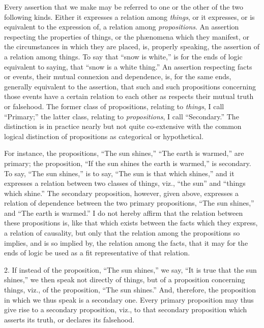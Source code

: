 \documentclass[oneside]{book}
\begin{document}
Every assertion that we make may be referred to one or the
other of the two following kinds. Either it expresses a relation
among \textit{things}, or it expresses, or is equivalent to the expression of,
a relation among \textit{propositions}. An assertion respecting the properties
of things, or the ph\ae{}nomena which they manifest, or the
circumstances in which they are placed, is, properly speaking, the
assertion of a relation among things. To say that ``snow is
white,'' is for the ends of logic equivalent to saying, that ``snow
is a white thing.'' An assertion respecting facts or events, their
mutual connexion and dependence, is, for the same ends, generally
equivalent to the assertion, that such and such propositions concerning
those events have a certain relation to each other as
respects their mutual truth or falsehood. The former class of
propositions, relating to \textit{things}, I call ``Primary;'' the latter class,
relating to \textit{propositions}, I call ``Secondary.'' The distinction is
in practice nearly but not quite co-extensive with the common
logical distinction of propositions as categorical or hypothetical.

For instance, the propositions, ``The sun shines,'' ``The earth
is warmed,'' are primary; the proposition, ``If the sun shines
the earth is warmed,'' is secondary. To say, ``The sun shines,''
is to say, ``The sun is that which shines,'' and it expresses a relation between two classes of things, viz., ``the sun'' and ``things
which shine.'' The secondary proposition, however, given above,
expresses a relation of dependence between the two primary propositions,
``The sun shines,'' and ``The earth is warmed.'' I do not
hereby affirm that the relation between these propositions is, like
that which exists between the facts which they express, a relation
of causality, but only that the relation among the propositions
so implies, and is so implied by, the relation among the
facts, that it may for the ends of logic be used as a fit representative
of that relation.

2. If instead of the proposition, ``The sun shines,'' we say,
``It is true that the sun shines,'' we then speak not directly of
things, but of a proposition concerning things, viz., of the proposition,
``The sun shines.'' And, therefore, the proposition in
which we thus speak is a secondary one. Every primary proposition
may thus give rise to a secondary proposition, viz., to
that secondary proposition which asserts its truth, or declares its
falsehood.
\end{document}
